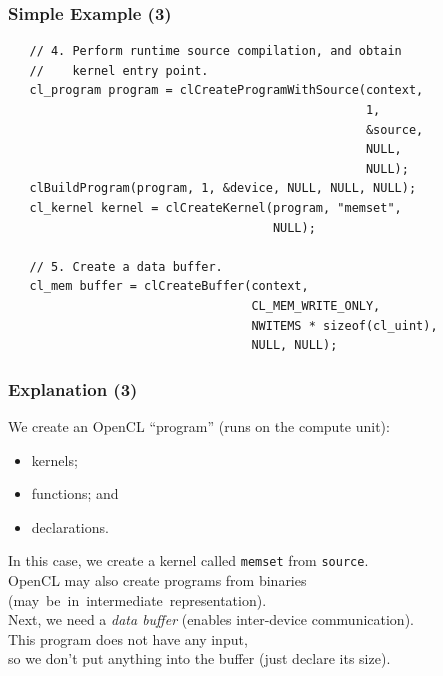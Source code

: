 \begin{frame}[fragile]
  \frametitle{Simple Example (3)}


  \begin{lstlisting}
   // 4. Perform runtime source compilation, and obtain
   //    kernel entry point.
   cl_program program = clCreateProgramWithSource(context,
                                                  1,
                                                  &source,
                                                  NULL,
                                                  NULL);
   clBuildProgram(program, 1, &device, NULL, NULL, NULL);
   cl_kernel kernel = clCreateKernel(program, "memset",
                                     NULL);

   // 5. Create a data buffer.
   cl_mem buffer = clCreateBuffer(context,
                                  CL_MEM_WRITE_ONLY,
                                  NWITEMS * sizeof(cl_uint),
                                  NULL, NULL);
  \end{lstlisting}

\end{frame}

\begin{frame}
  \frametitle{Explanation (3)}


    We create an OpenCL ``program'' (runs on the compute unit):
      \begin{itemize}
        \item kernels;
        \item functions; and
        \item declarations.
      \end{itemize}
    In this case, we create a kernel called {\tt memset} from {\tt source}.\\
    OpenCL may also create programs from binaries\\
      (may~be~in~intermediate~representation).\\[1em]

    Next, we need a {\it data buffer} (enables inter-device communication).\\[1em]

    This program does not have any input, \\
      so we don't put anything into
      the buffer (just declare its size).

\end{frame}

